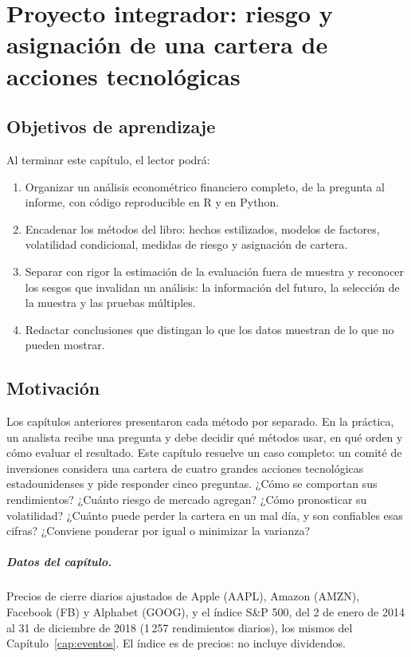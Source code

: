 \chapter[Proyecto integrador]{Proyecto integrador: riesgo y asignación de una cartera de acciones tecnológicas}\label{cap:proyecto}

\section*{Objetivos de aprendizaje}
Al terminar este capítulo, el lector podrá:
\begin{enumerate}[label=\arabic*.,leftmargin=*]
  \item Organizar un análisis econométrico financiero completo, de la pregunta al informe, con código reproducible en
        R y en Python.
  \item Encadenar los métodos del libro: hechos estilizados, modelos de factores, volatilidad condicional, medidas de
        riesgo y asignación de cartera.
  \item Separar con rigor la estimación de la evaluación fuera de muestra y reconocer los sesgos que invalidan un
        análisis: la información del futuro, la selección de la muestra y las pruebas múltiples.
  \item Redactar conclusiones que distingan lo que los datos muestran de lo que no pueden mostrar.
\end{enumerate}

\section*{Motivación}
Los capítulos anteriores presentaron cada método por separado. En la práctica, un analista recibe una pregunta y debe
decidir qué métodos usar, en qué orden y cómo evaluar el resultado. Este capítulo resuelve un caso completo: un comité de
inversiones considera una cartera de cuatro grandes acciones tecnológicas estadounidenses y pide responder cinco preguntas.
¿Cómo se comportan sus rendimientos? ¿Cuánto riesgo de mercado agregan? ¿Cómo pronosticar su volatilidad? ¿Cuánto puede
perder la cartera en un mal día, y son confiables esas cifras? ¿Conviene ponderar por igual o minimizar la varianza?

\paragraph{Datos del capítulo.} Precios de cierre diarios ajustados de Apple (AAPL), Amazon (AMZN), Facebook (FB) y
Alphabet (GOOG), y el índice S\&P 500, del 2 de enero de 2014 al 31 de diciembre de 2018 (1\,257 rendimientos diarios), los
mismos del Capítulo~\ref{cap:eventos}. El índice es de precios: no incluye dividendos.

